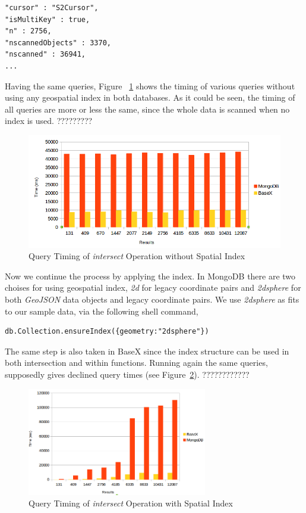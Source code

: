 \documentclass[a4paper,12pt]{article}
\begin{document}
\begin{verbatim}
"cursor" : "S2Cursor",
"isMultiKey" : true,
"n" : 2756,
"nscannedObjects" : 3370,
"nscanned" : 36941,
...
\end{verbatim}

Having the same queries, Figure ~\ref{figBXvsMongoNoIndexIntersects} shows the timing of various queries without using any geospatial index in both databases. As it could be seen, the timing of all queries are more or less the same, since the whole data is scanned when no index is used. ?????????

\begin{figure}
\centering
\includegraphics[width=\textwidth,height=0.25\textheight]{BXvsMongo-NoIndex-Intersects}
\caption{Query Timing of \textit{intersect} Operation without Spatial Index}
\label{figBXvsMongoNoIndexIntersects}
\end{figure}

Now we continue the process by applying the index. In MongoDB there are two choises for using geospatial index, \textit{2d} for legacy coordinate pairs and \textit{2dsphere} for both \textit{GeoJSON} data objects and legacy coordinate pairs. We use \textit{2dsphere} as fits to our sample data, via the following shell command,
\begin{verbatim}
db.Collection.ensureIndex({geometry:"2dsphere"})  
\end{verbatim}

The same step is also taken in BaseX since the index structure can be used in both intersection and within functions. Running again the same queries, supposedly gives declined query times (see Figure~\ref{figBXvsMongoIndexIntersects}). ????????????


\begin{figure}
\centering
\includegraphics[width=0.7\textwidth]{BXvsMongo-Intersects-Index}
\caption{Query Timing of \textit{intersect} Operation with Spatial Index}
\label{figBXvsMongoIndexIntersects}
\end{figure}
\end{document}
